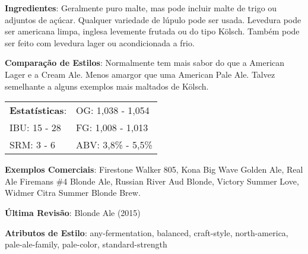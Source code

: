\textbf{Ingredientes}: Geralmente puro malte, mas pode incluir malte de trigo ou adjuntos de açúcar. Qualquer variedade de lúpulo pode ser usada. Levedura pode ser americana limpa, inglesa levemente frutada ou do tipo Kölsch. Também pode ser feito com levedura lager ou acondicionada a frio.

\textbf{Comparação de Estilos}: Normalmente tem mais sabor do que a American Lager e a Cream Ale. Menos amargor que uma American Pale Ale. Talvez semelhante a alguns exemplos mais maltados de Kölsch.

\begin{tabular}{@{}p{35mm}p{35mm}@{}}
  \textbf{Estatísticas}: & OG: 1,038 - 1,054 \\
  IBU: 15 - 28  & FG: 1,008 - 1,013  \\
  SRM: 3 - 6  & ABV: 3,8\% - 5,5\%
\end{tabular}

\textbf{Exemplos Comerciais}: Firestone Walker 805, Kona Big Wave Golden Ale, Real Ale Firemans \#4 Blonde Ale, Russian River Aud Blonde, Victory Summer Love, Widmer Citra Summer Blonde Brew.

\textbf{Última Revisão}: Blonde Ale (2015)

\textbf{Atributos de Estilo}: any-fermentation, balanced, craft-style, north-america, pale-ale-family, pale-color, standard-strength
